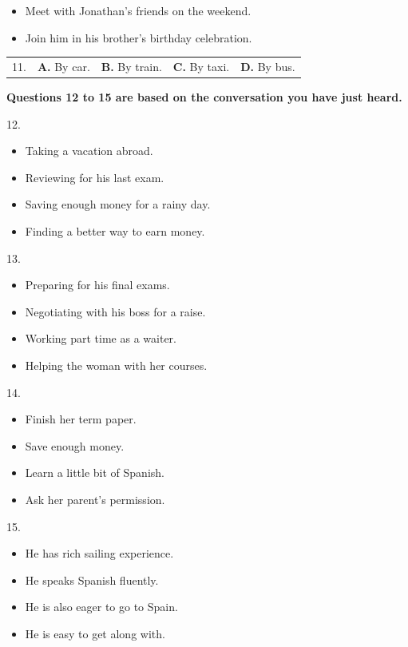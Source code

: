 \documentclass[UTF8,11pt]{ctexart}
\begin{document}
\begin{itemize}[leftmargin=2em,itemsep=.2em,topsep=.4em]\item[C.] Meet with Jonathan’s friends on the weekend.
\item[D.] Join him in his brother’s birthday celebration.
\end{itemize}

\noindent\begin{tabularx}{\linewidth}{@{}lXXXX@{}}11. & \textbf{A.} By car. & \textbf{B.} By train. & \textbf{C.} By taxi. & \textbf{D.} By bus.\\\end{tabularx}\par

\textbf{Questions 12 to 15 are based on the conversation you have just heard.}


12.


\begin{itemize}[leftmargin=2em,itemsep=.2em,topsep=.4em]\item[A.] Taking a vacation abroad.
\item[B.] Reviewing for his last exam.
\item[C.] Saving enough money for a rainy day.
\item[D.] Finding a better way to earn money.
\end{itemize}

13.


\begin{itemize}[leftmargin=2em,itemsep=.2em,topsep=.4em]\item[A.] Preparing for his final exams.
\item[B.] Negotiating with his boss for a raise.
\item[C.] Working part time as a waiter.
\item[D.] Helping the woman with her courses.
\end{itemize}

14.


\begin{itemize}[leftmargin=2em,itemsep=.2em,topsep=.4em]\item[A.] Finish her term paper.
\item[B.] Save enough money.
\item[C.] Learn a little bit of Spanish.
\item[D.] Ask her parent’s permission.
\end{itemize}

15.


\begin{itemize}[leftmargin=2em,itemsep=.2em,topsep=.4em]\item[A.] He has rich sailing experience.
\item[B.] He speaks Spanish fluently.
\item[C.] He is also eager to go to Spain.
\item[D.] He is easy to get along with.
\end{itemize}
\end{document}
